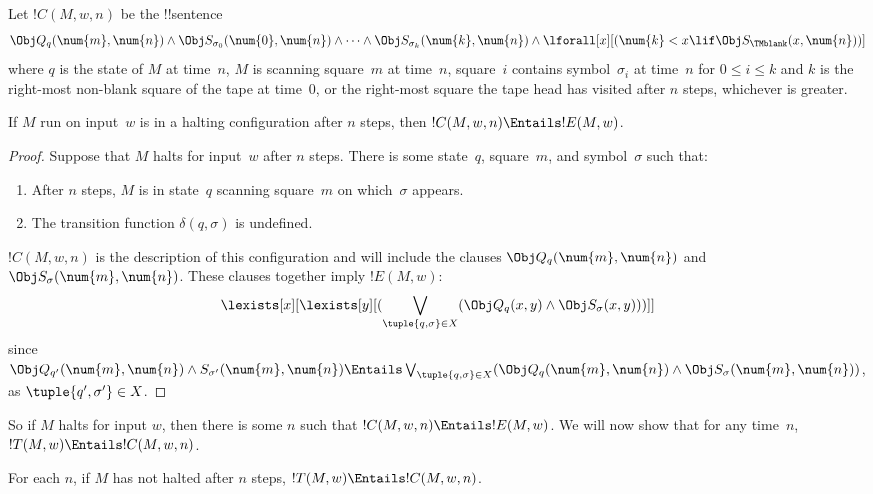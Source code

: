 \documentclass[../../../include/open-logic-section]{subfiles}
\begin{document}
\begin{defn} 
Let $!C(M, w, n)$ be the !!{sentence}
\[ 
\Obj Q_q(\num{m}, \num{n}) \land \Obj S_{\sigma_0}(\num{0}, \num{n})
\land \dots \land \Obj S_{\sigma_k}(\num{k}, \num{n}) \land
\lforall[x][(\num{k} < x \lif \Obj S_\TMblank(x, \num{n}))]
\] 
where $q$ is the state of $M$ at time~$n$, $M$ is scanning square~$m$
at time~$n$, square~$i$ contains symbol~$\sigma_i$ at time~$n$ for $0
\le i \le k$ and $k$ is the right-most non-blank square of the tape at
time~$0$, or the right-most square the tape head has visited after $n$
steps, whichever is greater.
\end{defn}

\begin{lem}
If $M$ run on input~$w$ is in a halting configuration after $n$ steps,
then $!C(M, w, n) \Entails !E(M, w)$.
\end{lem}

\begin{proof}
Suppose that $M$ halts for input~$w$ after $n$ steps.
There is some state~$q$, square~$m$, and symbol~$\sigma$ such that:
\begin{enumerate} 
\item After $n$ steps, $M$ is in state~$q$ scanning square~$m$ on
  which~$\sigma$ appears.
\item The transition function $\delta(q, \sigma)$ is undefined.
\end{enumerate}
$!C(M, w, n)$ is the description of this configuration and will
include the clauses $\Obj Q_{q}(\num{m}, \num{n})$ and $\Obj
S_{\sigma}(\num{m}, \num{n})$. These clauses together imply $!E(M,
w)$:
\[
\lexists[x][\lexists[y][(\bigvee_{\tuple{q, \sigma} \in
      X}(\Obj Q_q(x, y) \land \Obj S_\sigma(x, y)))]]
\]
since $\Obj Q_{q'}(\num{m}, \num{n}) \land S_{\sigma'}(\num{m},
\num{n}) \Entails \bigvee_{\tuple{q, \sigma} \in X} (\Obj Q_q(\num{m},
\num{n}) \land \Obj S_{\sigma}(\num{m}, \num{n}))$, as
$\tuple{q',\sigma'} \in X$. 
\end{proof}

\begin{explain}
So if $M$ halts for input $w$, then there is some $n$ such that $!C(M,
w, n) \Entails !E(M,w)$.  We will now show that for any time~$n$,
$!T(M, w) \Entails !C(M, w, n)$.
\end{explain}

\begin{lem}
For each $n$, if $M$ has not halted after $n$ steps, $!T(M, w)
\Entails !C(M, w, n)$.
\end{lem}
\end{document}
